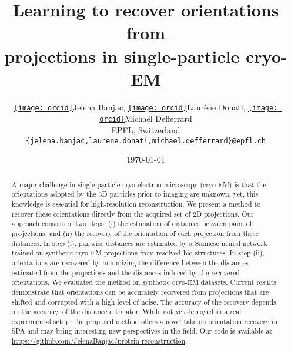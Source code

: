 \documentclass{article}
\author{
    \href{https://orcid.org/0000-0001-7373-4150}{\texttt{[image: orcid]}\hspace{1mm}}Jelena Banjac,
    \href{https://orcid.org/0000-0001-9834-7755}{\texttt{[image: orcid]}\hspace{1mm}}Laurène Donati,
    \href{https://orcid.org/0000-0002-6028-9024}{\texttt{[image: orcid]}\hspace{1mm}}Michaël Defferrard \\
    EPFL, Switzerland \\
    \texttt{\{jelena.banjac,laurene.donati,michael.defferrard\}@epfl.ch}
}
\date{\today}
\title{Learning to recover orientations from\\projections in single-particle cryo-EM}
\begin{document}
\maketitle

\begin{abstract}
    A major challenge in single-particle cryo-electron microscopy (cryo-EM) is that the orientations adopted by the 3D particles prior to imaging are unknown; yet, this knowledge is essential for high-resolution reconstruction.
    We present a method to recover these orientations directly from the acquired set of 2D projections.
    Our approach consists of two steps: (i) the estimation of distances between pairs of projections, and (ii) the recovery of the orientation of each projection from these distances.
    In step (i), pairwise distances are estimated by a Siamese neural network trained on synthetic cryo-EM projections from resolved bio-structures.
    In step (ii), orientations are recovered by minimizing the difference between the distances estimated from the projections and the distances induced by the recovered orientations.
    We evaluated the method on synthetic cryo-EM datasets.
    Current results demonstrate that orientations can be accurately recovered from projections that are shifted and corrupted with a high level of noise.
    The accuracy of the recovery depends on the accuracy of the distance estimator.
    While not yet deployed in a real experimental setup, the proposed method offers a novel take on orientation recovery in SPA and may bring interesting new perspectives in the field. 
    Our code is available at \url{https://github.com/JelenaBanjac/protein-reconstruction}.
\end{abstract}

%











\appendix

\end{document}
